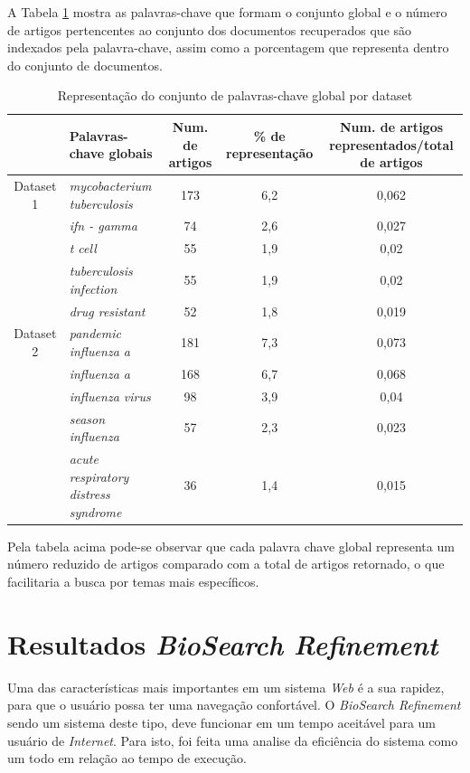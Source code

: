 A Tabela \ref{tab:representacao} mostra as palavras-chave que formam o conjunto global e o número de artigos pertencentes ao conjunto dos documentos recuperados que são indexados pela palavra-chave, assim como a porcentagem que representa dentro do conjunto de documentos. 

\begin{table}[htbp]
\center
\begin{tabular}{|l|p{4cm}|c|c|c|}
\hline
 & \textbf{Palavras-chave globais} & \multicolumn{1}{p{3cm}|}{\textbf{Num. de artigos}} & \multicolumn{1}{p{3cm}|}{\textbf{\% de representação}} & \multicolumn{1}{p{3cm}|}{\textbf{Num. de artigos representados/total de artigos}} \\ \hline
\multicolumn{ 1}{|c|}{Dataset 1} & \textit{mycobacterium tuberculosis} & 173 & 6,2 & 0,062 \\ \cline{ 2- 5}
\multicolumn{ 1}{|l|}{} & \textit{ifn - gamma} & 74 & 2,6 & 0,027 \\ \cline{ 2- 5}
\multicolumn{ 1}{|l|}{} & \textit{t cell} & 55 & 1,9 & 0,02 \\ \cline{ 2- 5}
\multicolumn{ 1}{|l|}{} & \textit{tuberculosis infection} & 55 & 1,9 & 0,02 \\ \cline{ 2- 5}
\multicolumn{ 1}{|l|}{} & \textit{drug resistant} & 52 & 1,8 & 0,019 \\ \hline
\multicolumn{ 1}{|c|}{Dataset 2} & \textit{pandemic influenza a} & 181 & 7,3 & 0,073 \\ \cline{ 2- 5}
\multicolumn{ 1}{|l|}{} & \textit{influenza a} & 168 & 6,7 & 0,068 \\ \cline{ 2- 5}
\multicolumn{ 1}{|l|}{} & \textit{influenza virus} & 98 & 3,9 & 0,04 \\ \cline{ 2- 5}
\multicolumn{ 1}{|l|}{} & \textit{season influenza} & 57 & 2,3 & 0,023 \\ \cline{ 2- 5}
\multicolumn{ 1}{|l|}{} & \textit{acute respiratory distress syndrome} & 36 & 1,4 & 0,015 \\ \hline
\end{tabular}
\caption{Representação do conjunto de palavras-chave global por dataset}
\label{tab:representacao}
\end{table}

Pela tabela acima pode-se observar que cada palavra chave global representa um número reduzido de artigos comparado com a total de artigos retornado, o que facilitaria a busca por temas mais específicos.

\section{Resultados \emph{BioSearch Refinement}}
Uma das características mais importantes em um sistema \emph{Web} é a sua rapidez, para que o usuário possa ter uma navegação confortável. O \emph{BioSearch Refinement} sendo um sistema deste tipo, deve funcionar em um tempo aceitável para um usuário de \emph{Internet}. Para isto, foi feita uma analise da eficiência do sistema como um todo em relação ao tempo de execução.

